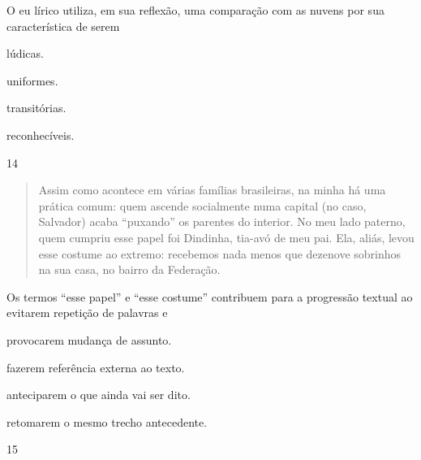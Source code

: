 
O eu lírico utiliza, em sua reflexão, uma comparação com as nuvens por
sua característica de serem

\begin{escolha}
\item lúdicas.

\item uniformes.

\item transitórias.

\item reconhecíveis.
\end{escolha}

\num{14}

\begin{quote}
Assim como acontece em várias famílias brasileiras, na minha há uma
prática comum: quem ascende socialmente numa capital (no caso, Salvador)
acaba ``puxando'' os parentes do interior. No meu lado paterno, quem
cumpriu esse papel foi Dindinha, tia-avó de meu pai. Ela, aliás, levou
esse costume ao extremo: recebemos nada menos que dezenove sobrinhos na
sua casa, no bairro da Federação.
\end{quote}


Os termos ``esse papel'' e ``esse costume'' contribuem para a progressão
textual ao evitarem repetição de palavras e

\begin{escolha}
\item provocarem mudança de assunto.

\item fazerem referência externa ao texto.

\item anteciparem o que ainda vai ser dito.

\item retomarem o mesmo trecho antecedente.
\end{escolha}

\num{15}

